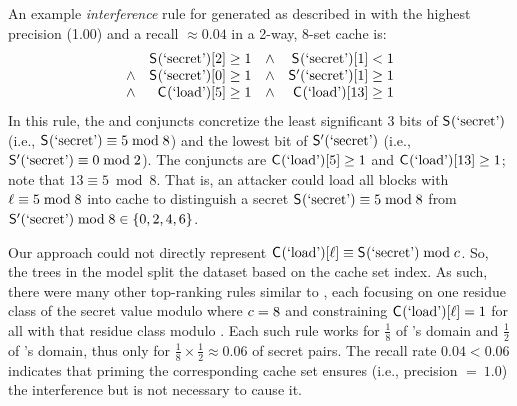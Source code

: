 An example \textit{interference} rule for \interferenceSet generated
as described in  with the highest precision
(1.00) and a recall $\approx 0.04$ in a 2-way, 8-set cache is:
\begin{align}
  \begin{array}{rrrr}
    & \mathsf{S}_{}(\textrm{`secret'})[2]\ge 1 & \wedge & \mathsf{S}_{}(\textrm{`secret'})[1]< 1 \\
    \wedge & \mathsf{S}_{}(\textrm{`secret'})[0]\ge 1 & \wedge & \mathsf{S}'_{}(\textrm{`secret'})[1]\ge 1 \\
    \wedge & \mathsf{C}_{}(\textrm{`load'})[5]\ge 1   & \wedge & \mathsf{C}_{}(\textrm{`load'})[13]\ge 1
  \end{array}
  \label{eqn:prime-probe-interference}
\end{align}
In this rule, the \SecFn{} and \SecFnAlt{} conjuncts concretize the
least significant 3 bits of $\mathsf{S}_{}(\textrm{`secret'})$ (i.e.,
$\mathsf{S}_{}(\textrm{`secret'}) \equiv 5 \bmod 8$) and the lowest bit of
$\mathsf{S}'_{}(\textrm{`secret'})$ (i.e., $\mathsf{S}'_{}(\textrm{`secret'}) \equiv 0 \bmod 2$). The \ACIFn{} conjuncts are $\mathsf{C}_{}(\textrm{`load'})[5]\ge 1$ and
$\mathsf{C}_{}(\textrm{`load'})[13]\ge 1$; note that $13\equiv 5 \bmod 8$. That
is, an attacker could load all blocks \block{\blockIdx} with
$\ell \equiv 5 \bmod 8$ into cache to distinguish a secret
$\mathsf{S}_{}(\textrm{`secret'}) \equiv 5 \bmod 8$ from $\mathsf{S}'_{}(\textrm{`secret'})
\bmod 8 \in \{0,2,4,6\}$.

Our approach could not directly represent
$\mathsf{C}_{}(\textrm{`load'})[\ell] \equiv \mathsf{S}_{}(\textrm{`secret'}) \bmod
c$.  So, the trees in the model split the dataset based on
the cache set index.  As such, there were many other top-ranking rules
similar to , each focusing on one
residue class of the secret value modulo \cachesetNmbr where
$c=8$ and constraining $\mathsf{C}_{}(\textrm{`load'})[\ell] = 1$
for all \blockIdx with that residue class modulo \cachesetNmbr.  Each
such rule works for $\frac{1}{8}$ of \SecFn{}'s domain and
$\frac{1}{2}$ of \SecFnAlt{}'s domain, thus only for
$\frac{1}{8}\times\frac{1}{2}\approx0.06$ of secret pairs. The recall
rate $0.04 < 0.06$ indicates that priming the corresponding cache set
ensures (i.e., precision $=~1.0$) the interference but is not
necessary to cause it.


